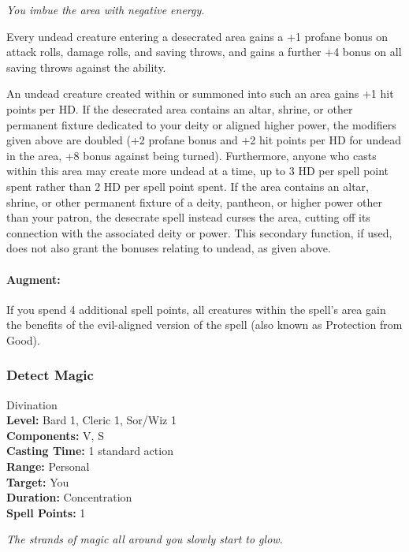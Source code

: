 \emph{You imbue the area with negative energy.}

Every undead creature entering a desecrated area gains a +1 profane bonus on attack rolls, damage rolls, and saving throws,
and gains a further +4 bonus on all saving throws against the  ability.

An undead creature created within or summoned into such an area gains +1 hit points per HD.
If the desecrated area contains an altar, shrine, or other permanent fixture dedicated to your deity or aligned higher power, 
the modifiers given above are doubled (+2 profane bonus and +2 hit points per HD for undead in the area, +8 bonus against being turned). 
Furthermore, anyone who casts  within this area may create more undead at a time,
up to 3 HD per spell point spent rather than 2 HD per spell point spent.
If the area contains an altar, shrine, or other permanent fixture of a deity, pantheon, or higher power other than your
patron, the desecrate spell instead curses the area, cutting off its connection with the associated deity or power. 
This secondary function, if used, does not also grant the bonuses relating to undead, as given above.

\paragraph{Augment:} If you spend 4 additional spell points, all creatures within the spell's area gain the benefits of the evil-aligned version of the
 spell (also known as Protection from Good).
\subsubsection{Detect Magic}
\label{Spell:DetectMagic}
Divination
\\ \textbf{Level:} Bard 1, Cleric 1, Sor/Wiz 1
\\ \textbf{Components:} V, S
\\ \textbf{Casting Time:} 1 standard action
\\ \textbf{Range:} Personal
\\ \textbf{Target:} You
\\ \textbf{Duration:} Concentration
\\ \textbf{Spell Points:} 1

\emph{The strands of magic all around you slowly start to glow.}

